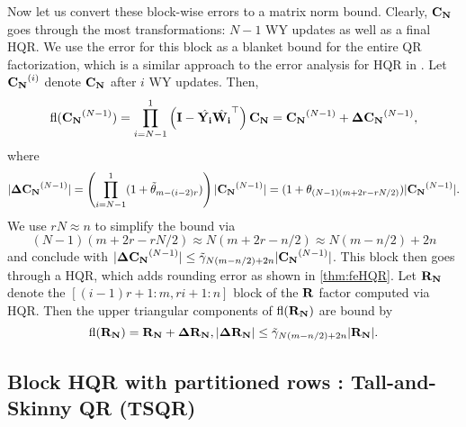 Now let us convert these block-wise errors to a matrix norm bound. 
Clearly, $\mathbf{C_N}$ goes through the most transformations: $N-1$ WY updates as well as a final HQR. 
We use the error for this block as a blanket bound for the entire QR factorization, which is a similar approach to the error analysis for HQR in \cite{Higham2002}.
Let $\mathbf{C_N}^{(i)}$ denote  $\mathbf{C_N}$ after $i$ WY updates. Then,
\begin{equation*}
	\mathrm{fl}(\mathbf{C_N}^{(N-1)}) =\prod_{i=N-1}^1 \left(\mathbf{I}-\hat{\mathbf{Y_{i}}}\hat{\mathbf{W_{i}}}^{\top}\right) \mathbf{C_N} = \mathbf{C_N}^{(N-1)} + \mathbf{\Delta C_N}^{(N-1)},
\end{equation*}
where 
\begin{equation*}
	|\mathbf{\Delta C_N}^{(N-1)}| = \left(\prod_{i=N-1}^1 (1+\tilde{\theta}_{m-(i-2)r})\right) |\mathbf{C_N}^{(N-1)}| = (1+\theta_{(N-1)(m+2r-rN/2)}) |\mathbf{C_N}^{(N-1)}|.
\end{equation*}
We use $rN \approx n$ to simplify the bound via $$ (N-1)(m+2r-rN/2) \approx N(m+2r-n/2) \approx N(m-n/2) +2n$$
and conclude with $|\mathbf{\Delta C_N}^{(N-1)}|\leq \tilde{\gamma}_{N(m-n/2) +2n}|\mathbf{C_N}^{(N-1)}|$.
This block then goes through a HQR, which adds rounding error as shown in \cref{thm:feHQR}. 
Let $\mathbf{R_N}$ denote the $[(i-1)r+1:m, ri+1:n]$ block of the $\mathbf{R}$ factor computed via HQR. 
Then the upper triangular components of $\mathrm{fl}(\mathbf{R_N})$ are bound by 
\begin{equation*}
	\mathrm{fl}(\mathbf{R_N}) = \mathbf{R_N} + \mathbf{\Delta R_N}, |\mathbf{\Delta R_N} |\leq \tilde{\gamma}_{N(m-n/2) +2n} |\mathbf{R_N}|.
\end{equation*}


\subsection{Block HQR with partitioned rows : Tall-and-Skinny QR (TSQR)}\label{sec:TSQR}